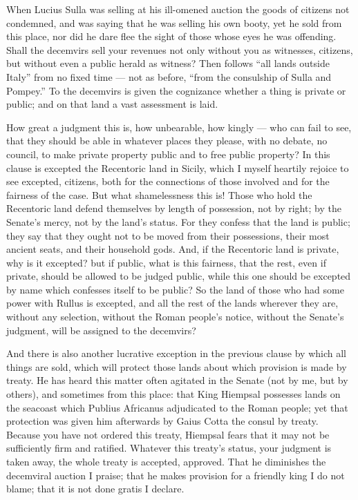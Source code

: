  When Lucius Sulla was selling at his ill-omened auction the goods of citizens not condemned, and was saying that he was selling his own booty, yet he sold from this place, nor did he dare flee the sight of those whose eyes he was offending. Shall the decemvirs sell your revenues not only without you as witnesses, citizens, but without even a public herald as witness? Then follows ``all lands outside Italy'' from no fixed time --- not as before, ``from the consulship of Sulla and Pompey.'' To the decemvirs is given the cognizance whether a thing is private or public; and on that land a vast assessment is laid.

 How great a judgment this is, how unbearable, how kingly --- who can fail to see, that they should be able in whatever places they please, with no debate, no council, to make private property public and to free public property? In this clause is excepted the Recentoric land in Sicily, which I myself heartily rejoice to see excepted, citizens, both for the connections of those involved and for the fairness of the case. But what shamelessness this is! Those who hold the Recentoric land defend themselves by length of possession, not by right; by the Senate's mercy, not by the land's status. For they confess that the land is public; they say that they ought not to be moved from their possessions, their most ancient seats, and their household gods. And, if the Recentoric land is private, why is it excepted? but if public, what is this fairness, that the rest, even if private, should be allowed to be judged public, while this one should be excepted by name which confesses itself to be public? So the land of those who had some power with Rullus is excepted, and all the rest of the lands wherever they are, without any selection, without the Roman people's notice, without the Senate's judgment, will be assigned to the decemvirs?

 And there is also another lucrative exception in the previous clause by which all things are sold, which will protect those lands about which provision is made by treaty. He has heard this matter often agitated in the Senate (not by me, but by others), and sometimes from this place: that King Hiempsal possesses lands on the seacoast which Publius Africanus adjudicated to the Roman people; yet that protection was given him afterwards by Gaius Cotta the consul by treaty. Because you have not ordered this treaty, Hiempsal fears that it may not be sufficiently firm and ratified. Whatever this treaty's status, your judgment is taken away, the whole treaty is accepted, approved. That he diminishes the decemviral auction I praise; that he makes provision for a friendly king I do not blame; that it is not done gratis I declare.

